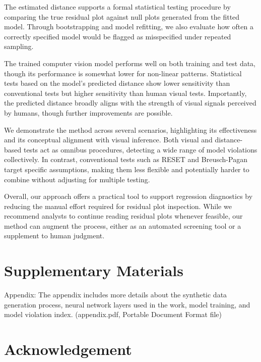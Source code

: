\documentclass[]{interact}
\theoremstyle{plain}%
\theoremstyle{definition}
\theoremstyle{remark}
\begin{document}
The estimated distance supports a formal statistical testing procedure
by comparing the true residual plot against null plots generated from
the fitted model. Through bootstrapping and model refitting, we also
evaluate how often a correctly specified model would be flagged as
misspecified under repeated sampling.

The trained computer vision model performs well on both training and
test data, though its performance is somewhat lower for non-linear
patterns. Statistical tests based on the model's predicted distance show
lower sensitivity than conventional tests but higher sensitivity than
human visual tests. Importantly, the predicted distance broadly aligns
with the strength of visual signals perceived by humans, though further
improvements are possible.

We demonstrate the method across several scenarios, highlighting its
effectiveness and its conceptual alignment with visual inference. Both
visual and distance-based tests act as omnibus procedures, detecting a
wide range of model violations collectively. In contrast, conventional
tests such as RESET and Breusch-Pagan target specific assumptions,
making them less flexible and potentially harder to combine without
adjusting for multiple testing.

Overall, our approach offers a practical tool to support regression
diagnostics by reducing the manual effort required for residual plot
inspection. While we recommend analysts to continue reading residual
plots whenever feasible, our method can augment the process, either as
an automated screening tool or a supplement to human judgment.

\section*{Supplementary Materials}\label{supplementary-materials}

\begin{description}
\item{Appendix:} The appendix includes more details about the synthetic data generation process, neural network layers used in the work, model training, and model violation index. (appendix.pdf, Portable Document Format file)
\end{description}

\section*{Acknowledgement}\label{acknowledgement}
\end{document}
